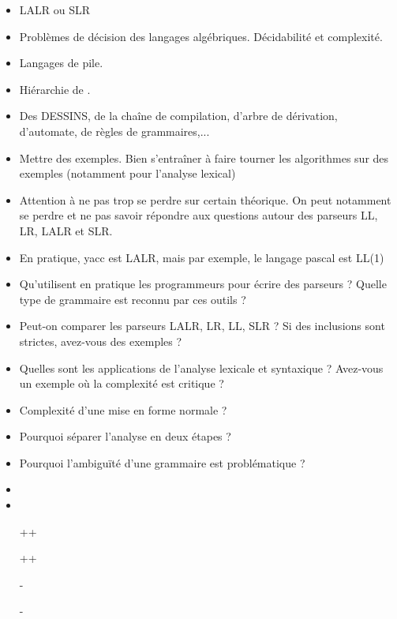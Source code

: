 \documentclass{agregfiche}
\begin{document}
\secidees

\begin{itemize}
	\item LALR ou SLR
    \item Problèmes de décision des langages algébriques. Décidabilité et complexité.
    \item Langages de pile.
    \item Hiérarchie de .
\end{itemize}

\secpieges

\begin{itemize}
    \item Des DESSINS, de la chaîne de compilation, d'arbre de dérivation, d'automate, de règles de grammaires,...
    \item Mettre des exemples. Bien s'entraîner à faire tourner les algorithmes sur des exemples (notamment pour l'analyse lexical)
	\item Attention à ne pas trop se perdre sur certain théorique. On peut notamment se perdre et ne pas savoir répondre aux questions autour des parseurs LL, LR, LALR et SLR. 
    \item En pratique, yacc est LALR, mais par exemple, le langage pascal est LL(1)

\end{itemize}

\secquestionsclassiques

\begin{itemize}
	\item Qu'utilisent en pratique les programmeurs pour écrire des parseurs ? Quelle type de grammaire est reconnu par ces outils ?
\item Peut-on comparer les parseurs LALR, LR, LL, SLR ? Si  des inclusions sont strictes, avez-vous des exemples ?
\item Quelles sont les applications de l'analyse lexicale et syntaxique ? Avez-vous un exemple où la complexité est critique ?
\item Complexité d'une mise en forme normale ?
\item Pourquoi séparer l'analyse en deux étapes ?
\item Pourquoi l'ambiguïté d'une grammaire est problématique ?
\end{itemize}

\secreferences

\begin{itemize}
\item 
\item 
\end{itemize}

\secdev

\begin{itemize}
\item[++] 
\item[++] 
\item[-] 
\item[-] 
\end{itemize}
\end{document}
